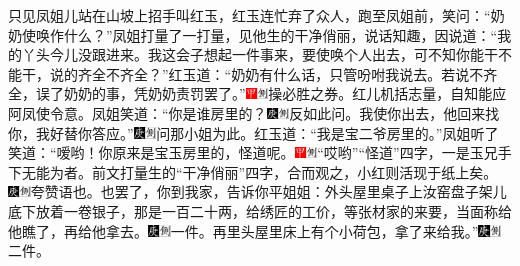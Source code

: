 只见凤姐儿站在山坡上招手叫红玉，红玉连忙弃了众人，跑至凤姐前，笑问：“奶奶使唤作什么？”凤姐打量了一打量，见他生的干净俏丽，说话知趣，因说道：“我的丫头今儿没跟进来。我这会子想起一件事来，要使唤个人出去，可不知你能干不能干，说的齐全不齐全？”红玉道：“奶奶有什么话，只管吩咐我说去。若说不齐全，误了奶奶的事，凭奶奶责罚罢了。”{\includegraphics[width=3mm]{../Images/00002}\includegraphics[width=3mm]{../Images/00011}\footnotesize \kaishu 操必胜之券。红儿机括志量，自知能应阿凤使令意。}凤姐笑道：“你是谁房里的？{\includegraphics[width=3mm]{../Images/00004}\includegraphics[width=3mm]{../Images/00011}\footnotesize \kaishu 反如此问。}我使你出去，他回来找你，我好替你答应。”{\includegraphics[width=3mm]{../Images/00004}\includegraphics[width=3mm]{../Images/00011}\footnotesize \kaishu 问那小姐为此。}红玉道：“我是宝二爷房里的。”凤姐听了笑道：“嗳哟！你原来是宝玉房里的，怪道呢。{\includegraphics[width=3mm]{../Images/00002}\includegraphics[width=3mm]{../Images/00011}\footnotesize \kaishu “哎哟”“怪道”四字，一是玉兄手下无能为者。前文打量生的“干净俏丽”四字，合而观之，小红则活现于纸上矣。　\includegraphics[width=3mm]{../Images/00004}\includegraphics[width=3mm]{../Images/00011}\footnotesize \kaishu 夸赞语也。}也罢了，你到我家，告诉你平姐姐：外头屋里桌子上汝窑盘子架儿底下放着一卷银子，那是一百二十两，给绣匠的工价，等张材家的来要，当面称给他瞧了，再给他拿去。{\includegraphics[width=3mm]{../Images/00004}\includegraphics[width=3mm]{../Images/00011}\footnotesize \kaishu 一件。}再里头屋里床上有个小荷包，拿了来给我。”{\includegraphics[width=3mm]{../Images/00004}\includegraphics[width=3mm]{../Images/00011}\footnotesize \kaishu 二件。}

